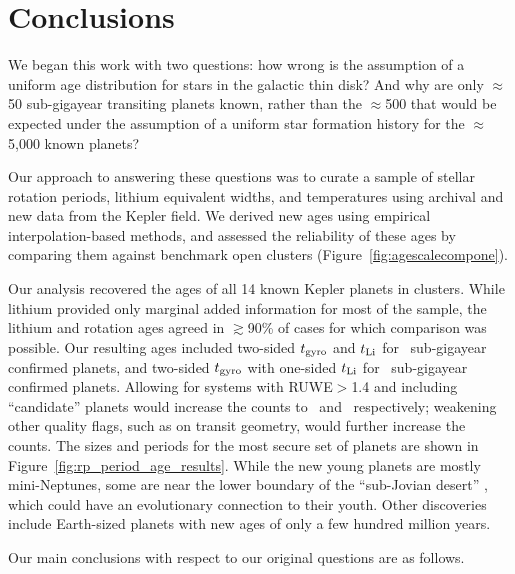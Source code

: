 \documentclass[11pt,twocolumn,tighten]{aastex63}
\begin{document}
\section{Conclusions}
\label{sec:conclusions}

We began this work with two questions: how wrong is the assumption
of a uniform age distribution for stars in the galactic thin disk?
And why are only $\approx$50 sub-gigayear transiting planets known,
rather than the $\approx$500 that would be expected under the
assumption of a uniform star formation history for the
$\approx$5{,}000 known planets?

Our approach to answering these questions was to curate a sample of
stellar rotation periods, lithium equivalent widths, and temperatures
using archival and new data from the Kepler field.  We derived new ages using empirical
interpolation-based methods, and assessed the reliability of these ages
by comparing them against benchmark open clusters
(Figure~\ref{fig:agescalecompone}).

Our analysis recovered the ages of all 14 known Kepler planets
in clusters.  While lithium provided only marginal added information
for most of the sample, the lithium and rotation ages agreed in
$\gtrsim$90\% of cases for which comparison was possible.
Our resulting ages included two-sided $t_{\rm gyro}$ and $t_{\rm Li}$
for \ltonegyrhighqconfirmedtwosided\ sub-gigayear confirmed planets, and
two-sided $t_{\rm gyro}$ with one-sided $t_{\rm Li}$ for
\ltonegyrhighqconfirmedonesided\ sub-gigayear confirmed planets.  Allowing for
systems with RUWE$>$1.4 and including ``candidate'' planets
would increase the counts to
\ltonegyrmediumqconfirmedtwosided\ and
\ltonegyrmediumqconfirmedonesided\ respectively; weakening other quality flags,
such as on transit geometry, would further increase the counts.  The sizes and
periods for the most secure set of planets are shown in
Figure~\ref{fig:rp_period_age_results}.   While the new young planets are
mostly mini-Neptunes, some are near the lower boundary of the
``sub-Jovian desert'' \citep{Owen2018}, which could have an evolutionary
connection to their youth.
Other discoveries include Earth-sized 
planets with new ages of only a few hundred million years.  

Our main conclusions with respect to our original questions are
as follows.
\end{document}
